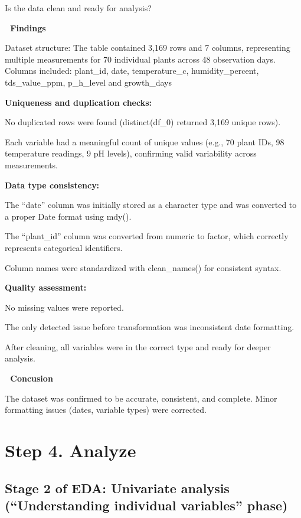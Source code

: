 \documentclass[
]{article}
\begin{document}
Is the data clean and ready for analysis?

\textbf{📄 Findings}

Dataset structure: The table contained 3,169 rows and 7 columns,
representing multiple measurements for 70 individual plants across 48
observation days. Columns included: plant\_id, date, temperature\_c,
humidity\_percent, tds\_value\_ppm, p\_h\_level and growth\_days

\textbf{Uniqueness and duplication checks:}

No duplicated rows were found (distinct(df\_0) returned 3,169 unique
rows).

Each variable had a meaningful count of unique values (e.g., 70 plant
IDs, 98 temperature readings, 9 pH levels), confirming valid variability
across measurements.

\textbf{Data type consistency:}

The ``date'' column was initially stored as a character type and was
converted to a proper Date format using mdy().

The ``plant\_id'' column was converted from numeric to factor, which
correctly represents categorical identifiers.

Column names were standardized with clean\_names() for consistent
syntax.

\textbf{Quality assessment:}

No missing values were reported.

The only detected issue before transformation was inconsistent date
formatting.

After cleaning, all variables were in the correct type and ready for
deeper analysis.

\textbf{🧠 Concusion}

The dataset was confirmed to be accurate, consistent, and complete.
Minor formatting issues (dates, variable types) were corrected.

\section{Step 4. Analyze}\label{step-4.-analyze}

\subsection{Stage 2 of EDA: Univariate analysis (``Understanding
individual variables''
phase)}\label{stage-2-of-eda-univariate-analysis-understanding-individual-variables-phase}
\end{document}
